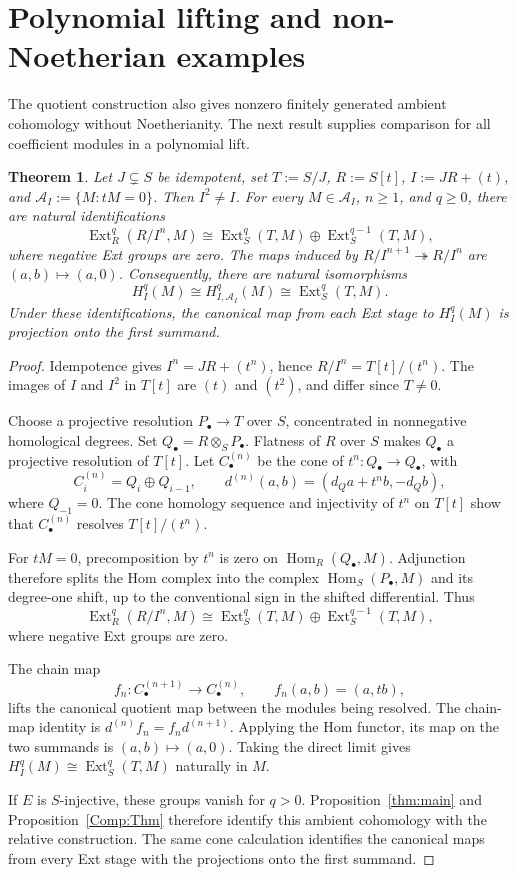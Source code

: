 \documentclass[11pt,reqno]{amsart}
\newtheorem{theorem}{Theorem}[section]
\theoremstyle{definition}
\theoremstyle{remark}
\newcommand{\Hom}{\operatorname{Hom}}
\newcommand{\Ext}{\operatorname{Ext}}
\newcommand{\A}{\mathcal A_I}
\begin{document}
\section{Polynomial lifting and non-Noetherian examples}\label{sec:lift}
The quotient construction also gives nonzero finitely generated ambient cohomology without Noetherianity. The next result supplies comparison for all coefficient modules in a polynomial lift.
\begin{theorem}\label{thm:lift}
Let $J\subsetneq S$ be idempotent, set $T:=S/J$, $R:=S[t]$, $I:=JR+(t)$, and $\A:=\{M:tM=0\}$. Then $I^2\ne I$. For every $M\in\A$, $n\geq1$, and $q\geq0$, there are natural identifications
\[
\Ext_R^q(R/I^n,M)\cong\Ext_S^q(T,M)\oplus\Ext_S^{q-1}(T,M),
\]
where negative Ext groups are zero. The maps induced by $R/I^{n+1}\twoheadrightarrow R/I^n$ are $(a,b)\mapsto(a,0)$. Consequently, there are natural isomorphisms
\[
H_I^q(M)\cong H_{I,\A}^q(M)\cong\Ext_S^q(T,M).
\]
Under these identifications, the canonical map from each Ext stage to $H_I^q(M)$ is projection onto the first summand.
\end{theorem}
\begin{proof}
Idempotence gives $I^n=JR+(t^n)$, hence $R/I^n=T[t]/(t^n)$. The images of $I$ and $I^2$ in $T[t]$ are $(t)$ and $(t^2)$, and differ since $T\ne0$.

Choose a projective resolution $P_\bullet\to T$ over $S$, concentrated in nonnegative homological degrees. Set $Q_\bullet=R\otimes_SP_\bullet$. Flatness of $R$ over $S$ makes $Q_\bullet$ a projective resolution of $T[t]$. Let $C^{(n)}_\bullet$ be the cone of $t^n:Q_\bullet\to Q_\bullet$, with
\[
C^{(n)}_i=Q_i\oplus Q_{i-1},\qquad
 d^{(n)}(a,b)=(d_Qa+t^nb,-d_Qb),
\]
where $Q_{-1}=0$. The cone homology sequence and injectivity of $t^n$ on $T[t]$ show that $C^{(n)}_\bullet$ resolves $T[t]/(t^n)$.

For $tM=0$, precomposition by $t^n$ is zero on $\Hom_R(Q_\bullet,M)$. Adjunction therefore splits the Hom complex into the complex $\Hom_S(P_\bullet,M)$ and its degree-one shift, up to the conventional sign in the shifted differential. Thus
\begin{equation}\label{eq:cone}
\Ext_R^q(R/I^n,M)\cong\Ext_S^q(T,M)\oplus\Ext_S^{q-1}(T,M),
\end{equation}
where negative Ext groups are zero.

The chain map
\[
f_n:C^{(n+1)}_\bullet\to C^{(n)}_\bullet,
\qquad f_n(a,b)=(a,tb),
\]
lifts the canonical quotient map between the modules being resolved. The chain-map identity is $d^{(n)}f_n=f_nd^{(n+1)}$. Applying the Hom functor, its map on the two summands is $(a,b)\mapsto(a,0)$. Taking the direct limit gives $H_I^q(M)\cong\Ext_S^q(T,M)$ naturally in $M$.

If $E$ is $S$-injective, these groups vanish for $q>0$. Proposition~\ref{thm:main} and Proposition~\ref{Comp:Thm} therefore identify this ambient cohomology with the relative construction. The same cone calculation identifies the canonical maps from every Ext stage with the projections onto the first summand.
\end{proof}
\end{document}

